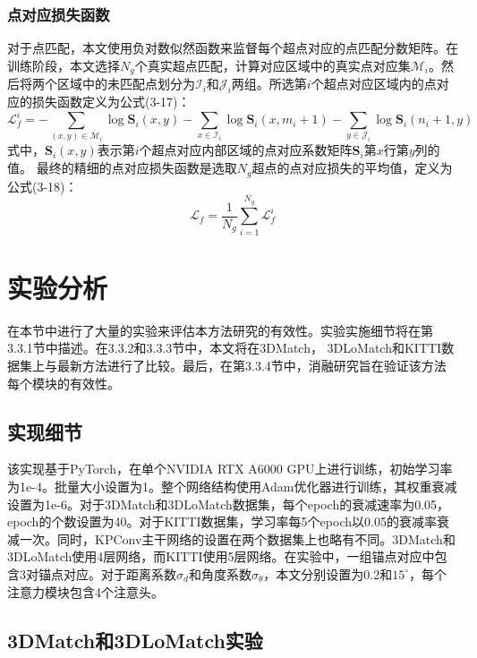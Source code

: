     \subsubsection{点对应损失函数}
    对于点匹配，本文使用负对数似然函数来监督每个超点对应的点匹配分数矩阵。在训练阶段，本文选择$N_g$个真实超点匹配，计算对应区域中的真实点对应集$\mathcal{M}_{i}$。然后将两个区域中的未匹配点划分为$\mathcal{I}_{i}$和$\mathcal{J}_{i}$两组。所选第$i$个超点对应区域内的点对应的损失函数定义为公式(3-17)：
    \begin{equation}
        \mathcal{L}_{f}^i=
        -\sum_{(x, y) \in \mathcal{M}_{i}} \log \mathbf{S}_i(x,y)
        -\sum_{x \in \mathcal{I}_{i}} \log \mathbf{S}_i(x, m_{i}+1)
        -\sum_{y \in \mathcal{J}_{i}} \log \mathbf{S}_i(n_{i}+1, y)
    \end{equation}
    式中，$\mathbf{S}_i(x,y)$表示第$i$个超点对应内部区域的点对应系数矩阵$\mathbf{S}_i$第$x$行第$y$列的值。
    最终的精细的点对应损失函数是选取$N_g$超点的点对应损失的平均值，定义为公式(3-18)：
    \begin{equation}
        \mathcal{L}_{f}=\frac{1}{N_g}\sum_{i=1}^{N_g}\mathcal{L}_{f}^i
    \end{equation}

    \section{实验分析}
    在本节中进行了大量的实验来评估本方法研究的有效性。实验实施细节将在第3.3.1节中描述。在3.3.2和3.3.3节中，本文将在3DMatch， 3DLoMatch和KITTI数据集上与最新方法进行了比较。最后，在第3.3.4节中，消融研究旨在验证该方法每个模块的有效性。

    \subsection{实现细节}
    该实现基于PyTorch，在单个NVIDIA RTX A6000 GPU上进行训练，初始学习率为1e-4。批量大小设置为1。整个网络结构使用Adam优化器进行训练，其权重衰减设置为1e-6。对于3DMatch和3DLoMatch数据集，每个epoch的衰减速率为0.05，epoch的个数设置为40。对于KITTI数据集，学习率每5个epoch以0.05的衰减率衰减一次。同时，KPConv主干网络的设置在两个数据集上也略有不同。3DMatch和3DLoMatch使用4层网络，而KITTI使用5层网络。在实验中，一组锚点对应中包含3对锚点对应。对于距离系数$\sigma_d$和角度系数$\sigma_{\theta}$，本文分别设置为0.2和$15^\circ$，每个注意力模块包含4个注意头。

    \subsection{3DMatch和3DLoMatch实验}
